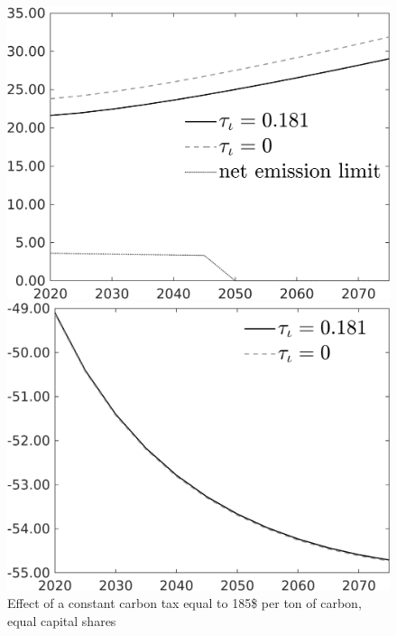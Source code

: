  \begin{figure}[h!!]
	\centering
	\caption{Effect of a constant carbon tax equal to 185\$ per ton of carbon, equal capital shares }\label{fig:Leveltauf_nsk0_xgr0_equal_know}		
	\begin{minipage}[]{0.32\textwidth}
		\includegraphics[width=1\textwidth]{../../codding_model/own_basedOnFried/optimalPol_010922_revision/figures/all_13Sept22/CompTauf_bytaul_Equlab_Reg0_Emnet_spillover0_nsk0_xgr0_knspil0_sep0_LFlimit0_emsbase0_countec0_GovRev0_etaa0.79_lgd1.png}
	\end{minipage}	
	\begin{minipage}[]{0.32\textwidth}
		\includegraphics[width=1\textwidth]{../../codding_model/own_basedOnFried/optimalPol_010922_revision/figures/all_13Sept22/PerdifNoTauf_Equlab_regime0_CompTaul_F_spillover0_nsk0_xgr0_knspil0_sep0_LFlimit0_emsbase0_countec0_GovRev0_etaa0.79_lgd1.png}

\end{minipage}
\end{figure}
